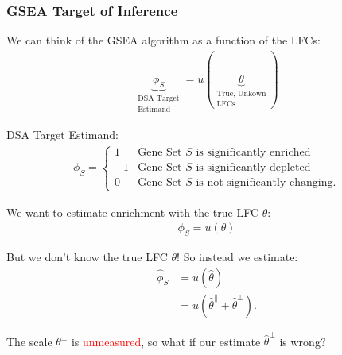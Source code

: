 \documentclass[11pt]{beamer}
\begin{document}
\begin{frame}
  \frametitle{GSEA Target of Inference}

  We can think of the GSEA algorithm as a function of the LFCs:
  \begin{align*}
    \underbrace{\phi_S}_{\substack{\text{DSA Target} \\ \text{Estimand}}} = u(\underbrace{\theta}_{\substack{\text{True, Unkown} \\ \text{LFCs}}})
  \end{align*}

  DSA Target Estimand:
  \begin{align*}
    \phi_S = \begin{cases}
      1 & \text{Gene Set } S \text{ is significantly enriched} \\
      -1 & \text{Gene Set } S \text{ is significantly depleted} \\
      0 & \text{Gene Set } S \text{ is not significantly changing}.
    \end{cases}
  \end{align*}

\end{frame}

\begin{frame}
  We want to estimate enrichment with the true LFC \(\theta\):
  \begin{align*}
    \phi_S = u(\theta)
  \end{align*}

  \pause

  But we don't know the true LFC \(\theta\)! So instead we estimate:
  \begin{align*}
    \hat{\phi}_S &= u(\hat{\theta}) \\
                 &= u(\hat{\theta}^\parallel+\hat{\theta}^\perp).
  \end{align*}

  \pause
  
  The scale \(\theta^\perp\) is \textcolor{red}{unmeasured}, so what if our estimate \(\hat{\theta}^\perp\) is wrong?
\end{frame}
\end{document}
